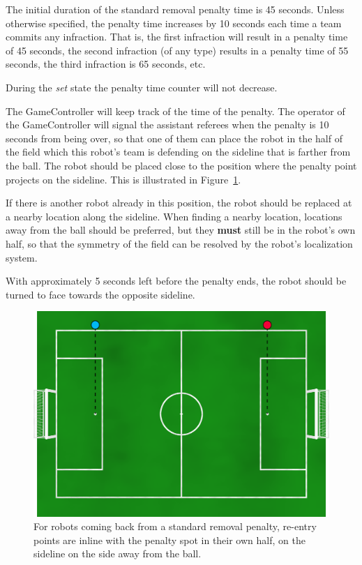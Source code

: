 \documentclass[12pt]{article}
\newcommand{\StandardPenaltyTime}{45 seconds\xspace}
\newcommand{\StandardPenaltyIncrease}{10 seconds\xspace}
\begin{document}
The initial duration of the standard removal penalty time is \StandardPenaltyTime.
Unless otherwise specified, the penalty time increases by \StandardPenaltyIncrease each time a team commits any infraction. 
That is, the first infraction will result in a penalty time of 45 seconds, the second infraction (of any type) results in a penalty time of 55 seconds, the third infraction is 65 seconds, etc.

During the \emph{set} state the penalty time counter will not decrease.

The GameController will keep track of the time of the penalty. The operator of the GameController will signal the assistant referees when the penalty is 10 seconds from being over, so that one of them can place the robot in the half of the field which this robot's team is defending on the sideline that is farther from the ball. The robot should be placed close to the position where the penalty point projects on the sideline. This is illustrated in Figure~\ref{fig:penalty_re-entry_points}.

If there is another robot already in this position, the robot should be replaced at a nearby location along the sideline. When finding a nearby location, locations away from the ball should be preferred, but they \textbf{must} still be in the robot's own half, so that the symmetry of the field can be resolved by the robot's localization system.

With approximately 5 seconds left before the penalty ends, the robot should be turned to face towards the opposite sideline.

\begin{figure}[t]
\centerline{\includegraphics[width=\columnwidth]{figs/penalty_re-entry_points_2020.png}}
\caption{For robots coming back from a standard removal penalty, re-entry points  are inline with the penalty spot in their own half, on the sideline on the side away from the ball.}
\label{fig:penalty_re-entry_points}
\end{figure}
\end{document}
